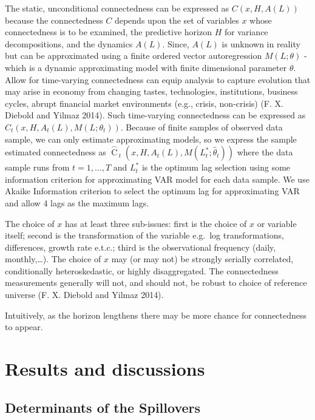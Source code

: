 \documentclass[]{elsarticle} %
\begin{document}
The static, unconditional connectedness can be expressed as
\(C\left( x,H,A\left( L \right) \right)\) because the connectedness
\(C\) depends upon the set of variables \(x\) whose connectedness is to
be examined, the predictive horizon \(H\) for variance decompositions,
and the dynamics \(A\left( L \right)\). Since, \(A\left( L \right)\) is
unknown in reality but can be approximated using a finite ordered vector
autoregression \(M\left( L;\theta \right)\) -which is a dynamic
approximating model with finite dimensional parameter \(\theta\). Allow
for time-varying connectedness can equip analysis to capture evolution
that may arise in economy from changing tastes, technologies,
institutions, business cycles, abrupt financial market environments
(e.g., crisis, non-crisis) (F. X. Diebold and Yilmaz 2014). Such
time-varying connectedness can be expressed as
\({{C}_{t}}\left( x,H,{{A}_{t}}\left( L \right),M\left( L;{{\theta }_{t}} \right) \right)\).
Because of finite samples of observed data sample, we can only estimate
approximating models, so we express the sample estimated connectedness
as
\({{\overset{\frown }{\mathop{C}}\,}_{t}}\left( x,H,{{A}_{t}}\left( L \right),M\left( L_{t}^{*};{{{\hat{\theta }}}_{t}} \right) \right)\)
where the data sample runs from \(t=1,\ldots ,T\) and \(L_{t}^{*}\) is
the optimum lag selection using some information criterion for
approximating VAR model for each data sample. We use Akaike Information
criterion to select the optimum lag for approximating VAR and allow 4
lags as the maximum lags.

The choice of \(x\) has at least three sub-issues: first is the choice
of \(x\) or variable itself; second is the transformation of the
variable e.g.~log transformations, differences, growth rate e.t.c.;
third is the observational frequency (daily, monthly,\ldots{}). The
choice of \(x\) may (or may not) be strongly serially correlated,
conditionally heteroskedastic, or highly disaggregated. The
connectedness measurements generally will not, and should not, be robust
to choice of reference universe (F. X. Diebold and Yilmaz 2014).

Intuitively, as the horizon lengthens there may be more chance for
connectedness to appear.

\section{Results and discussions}\label{results-and-discussions}

\subsection{Determinants of the
Spillovers}\label{determinants-of-the-spillovers}
\end{document}

